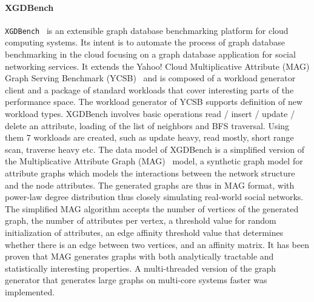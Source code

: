 \paragraph{XGDBench} \texttt{XGDBench}~\cite{Dayarathna:2014:GDB:2676904.2676939} is an extensible graph database benchmarking platform for cloud computing systems. Its intent is to automate
the process of graph database benchmarking in the cloud focusing on a graph database application for social networking services. It extends the Yahoo! Cloud Multiplicative Attribute (MAG) Graph Serving Benchmark (YCSB)~\cite{Cooper:2010:BCS:1807128.1807152} and is composed of a workload generator client and a package of standard workloads that cover interesting parts of the performance space.
The workload generator of YCSB supports definition of new workload types. XGDBench involves basic operations read / insert / update / delete an attribute, loading of the list of neighbors and BFS traversal. Using them 7 workloads are created, such as update heavy, read mostly, short range scan, traverse heavy etc.
The data model of XGDBench is a simplified version of the Multiplicative Attribute Graph (MAG)~\cite{Kim2010} model, a synthetic graph model for attribute graphs which models the interactions between the network structure and the node attributes.
The generated graphs are thus in MAG format, with power-law degree distribution thus closely simulating real-world social networks.
The simplified MAG algorithm accepts the number of vertices of the generated graph, the number of attributes per vertex, a threshold value for random initialization of attributes, an edge affinity threshold value that determines whether there is an edge between two vertices, and an affinity matrix. It has been proven that MAG generates graphs with both analytically tractable and statistically interesting properties. A multi-threaded version of the graph generator that generates large graphs on multi-core systems faster was implemented.



